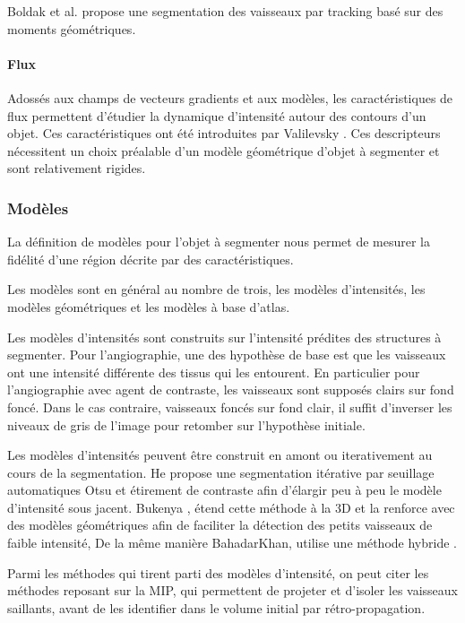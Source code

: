 Boldak et al. \cite{boldak2003_moments} propose une segmentation des vaisseaux par tracking basé sur des moments géométriques.

\paragraph{Flux}

Adossés aux champs de vecteurs gradients et aux modèles, les caractéristiques de flux permettent d'étudier la dynamique d'intensité autour des contours d'un objet. Ces caractéristiques ont été introduites par Valilevsky \cite{Vasilevskiy2002_flux}. Ces descripteurs nécessitent un choix préalable d'un modèle géométrique d'objet à segmenter et sont relativement rigides.

\subsubsection{Modèles}

La définition de modèles pour l'objet à segmenter nous permet de mesurer la fidélité d'une région décrite par des caractéristiques.

Les modèles sont en général au nombre de trois, les modèles d'intensités, les modèles géométriques et les modèles à base d'atlas.

Les modèles d'intensités sont construits sur l'intensité prédites des structures à segmenter. Pour l'angiographie, une des hypothèse de base est que les vaisseaux ont une intensité différente des tissus qui les entourent. En particulier pour l'angiographie avec agent de contraste, les vaisseaux sont supposés clairs sur fond foncé. Dans le cas contraire,   vaisseaux foncés sur fond clair, il suffit d'inverser les niveaux de gris de l'image pour retomber sur l'hypothèse initiale.

Les modèles d'intensités peuvent être construit en amont ou iterativement au cours de la segmentation. He \cite{He2013_multi_otsu} propose une segmentation itérative par seuillage automatiques Otsu et étirement de contraste afin d'élargir peu à peu le modèle d'intensité sous jacent. Bukenya \cite{Bukenya2016_heart_otsu_top_hat_hessian}, étend cette méthode à la 3D et la renforce avec des modèles géométriques afin de faciliter la détection des petits vaisseaux de faible intensité, De la même manière BahadarKhan, utilise une méthode hybride \cite{Bahadarkhan2016_fundus_region_based_otsu}.

Parmi les méthodes qui tirent parti des modèles d'intensité, on peut citer les méthodes reposant sur la MIP, qui permettent de projeter et d'isoler les vaisseaux saillants, avant de les identifier dans le volume initial par rétro-propagation.


